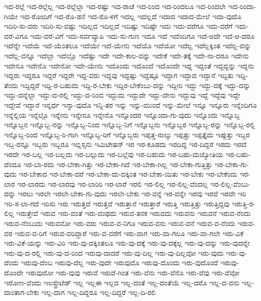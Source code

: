 {ಇದ-ರಲ್ಲೆ
ಇದ-ರಲ್ಲೆಲ್ಲ
ಇದ-ರಲ್ಲೆಲ್ಲಾ
ಇದ-ರಷ್ಟು
ಇದ-ರಾಚೆ
ಇದ-ರಿಂದ
ಇದ-ರಿಂದಲೂ
ಇದ-ರಿಂದಲೇ
ಇದ-ರಿಂದಾ-ಗಿಯೇ
ಇದ-ರೊಂದಿಗೆ
ಇದ-ರೊ-ಡನೆ
ಇದ-ರೊ-ಳಗೆ
ಇದಲ್ಲ
ಇದಲ್ಲದೆ
ಇದಾದ
ಇದಾದ-ಮೇಲೆ
ಇದಾ-ವುದೊ
ಇದಿರಿ-ಸು-ವರು
ಇದಿರಿ-ಸು-ವಷ್ಟು
ಇದಿಲ್ಲದ
ಇದಿಲ್ಲದೆ
ಇದಿಷ್ಟು
ಇದಿಷ್ಟೇ
ಇದು
ಇದು-ವರೆಗೂ
ಇದು-ವರೆಗೆ
ಇದು-ವರೆ-ವಿಗೂ
ಇದು-ವರೆ-ವಿಗೆ
ಇದು-ಸರ್ವವ್ಯಾಪಿ
ಇದು-ಸು-ಗುಣ
ಇದೂ
ಇದೆ
ಇದೆಂದಿಗೂ
ಇದೆ-ಅದೇ
ಇದೆ-ಆ-ದರೂ
ಇದೆನ್ನೇ
ಇದೆಯೆ
ಇದೆ-ಯೆಂತಲೂ
ಇದೆಯೇ
ಇದೆ-ಯೇನು
ಇದೆಯೊ
ಇದೆಯೋ
ಇದೆಲ್ಲ
ಇದೆಲ್ಲಕ್ಕಿಂತ
ಇದೆಲ್ಲ-ವನ್ನು
ಇದೆಲ್ಲ-ವನ್ನೂ
ಇದೆಲ್ಲಾ
ಇದೆಲ್ಲೊ
ಇದೆಷ್ಟು
ಇದೇ
ಇದೇ-ಕಾಲ-ವನ್ನು
ಇದೇಕೆ
ಇದೇ-ತಕ್ಕೆ
ಇದೇ-ನಾ-ದರೂ
ಇದೇನು
ಇದೇನೂ
ಇದೇನೊ
ಇದೇನೋ
ಇದೇ-ಯೇನು
ಇದೊಂದು
ಇದೊಂದೆ
ಇದೊಂದೇ
ಇದ್ದ
ಇದ್ದಂತೆ
ಇದ್ದದ್ದನ್ನು
ಇದ್ದನು
ಇದ್ದರು
ಇದ್ದರೂ
ಇದ್ದರೆ
ಇದ್ದರೇ
ಇದ್ದ-ವರು
ಇದ್ದವು
ಇದ್ದಷ್ಟು
ಇದ್ದಷ್ಟೂ
ಇದ್ದಾಗ
ಇದ್ದಾದ
ಇದ್ದಾನೆ
ಇದ್ದಿತು
ಇದ್ದಿ-ತೆಂದು
ಇದ್ದಿದ್ದರೆ
ಇದ್ದಿ-ರ-ಬಹುದು
ಇದ್ದಿ-ರ-ಬೇಕು
ಇದ್ದಿರ-ಬೇಕೆಂಬು-ದನ್ನು
ಇದ್ದೀರಿ
ಇದ್ದು
ಇದ್ದು-ದಕ್ಕೆ
ಇದ್ದು-ದನ್ನು
ಇದ್ದು-ದನ್ನೆಲ್ಲಾ
ಇದ್ದು-ದ-ರಲ್ಲಿ
ಇದ್ದು-ದ-ರಿಂದ
ಇದ್ದುದು
ಇದ್ದುದೇ
ಇದ್ದು-ದೇನು
ಇದ್ದುವು
ಇದ್ದೆ
ಇದ್ದೆವು
ಇದ್ದೇ
ಇದ್ದೇವೆ
ಇದ್ಧಾನೆ
ಇನ್ನರ್ಧ
ಇನ್ನಾ-ವುದೊ
ಇನ್ನಿ-ತರ
ಇನ್ನು
ಇನ್ನು-ಮುಂದೆ
ಇನ್ನು-ಮೇಲೆ
ಇನ್ನೂ
ಇನ್ನೂರು
ಇನ್ನೆಂದಿಗೂ
ಇನ್ನೆಲ್ಲಿಯ
ಇನ್ನೆಲ್ಲೊ
ಇನ್ನೇನು
ಇನ್ನೇನೂ
ಇನ್ನೇನೊ
ಇನ್ನೊಂದರ
ಇನ್ನೊಂದಾ-ಗು-ವುದು
ಇನ್ನೊಂದು
ಇನ್ನೊಬ್ಬ
ಇನ್ನೊಬ್ಬನ
ಇನ್ನೊಬ್ಬ-ನನ್ನು
ಇನ್ನೊಬ್ಬ-ನಿಂದ
ಇನ್ನೊಬ್ಬ-ನಿಗೆ
ಇನ್ನೊಬ್ಬನು
ಇನ್ನೊಬ್ಬರ
ಇನ್ನೊಬ್ಬ-ರನ್ನು
ಇನ್ನೊಬ್ಬ-ರಲ್ಲಿ
ಇನ್ನೊಬ್ಬ-ರಿಂದ
ಇನ್ನೊಬ್ಬ-ರಿ-ಗಾಗಿ
ಇನ್ನೊಬ್ಬ-ರಿಗೆ
ಇನ್ನೊಬ್ಬರು
ಇಪ್ಪತ್ತ-ನಾಲ್ಕು
ಇಪ್ಪತ್ತು
ಇಪ್ಪತ್ತೈದು
ಇಪ್ಪುತ್ತು
ಇಬ್ಬರ
ಇಬ್ಬ-ರನ್ನೂ
ಇಬ್ಬರು
ಇಬ್ಬರೂ
ಇಬ್ಲಿಸ್ಸನು
ಇಮಿಟೇಷನ್
ಇರ
ಇರ-ಕೂಡದು
ಇರದಿದ್ದ
ಇರ-ದಿದ್ದರೆ
ಇರದು
ಇರದೆ
ಇರದೇ
ಇರ-ಬಲ್ಲ
ಇರ-ಬಲ್ಲದು
ಇರ-ಬಲ್ಲುದು
ಇರ-ಬಲ್ಲೆವು
ಇರ-ಬಹುದು
ಇರ-ಬಹು-ದುಜ್ಯೋತಿಯ
ಇರ-ಬಹು-ದೆಂದೂ
ಇರ-ಬಾ-ರದು
ಇರ-ಬೇಕಾ-ಗಿತ್ತು
ಇರ-ಬೇಕಾ-ಗಿದೆ
ಇರ-ಬೇಕಾ-ಗಿಲ್ಲ
ಇರ-ಬೇಕಾ-ಗುತ್ತಿತ್ತು
ಇರ-ಬೇಕಾ-ಗು-ವುದು
ಇರ-ಬೇಕಾದ
ಇರ-ಬೇಕಾ-ದರೆ
ಇರ-ಬೇಕಾ-ದು-ದಕ್ಕಿಂತ
ಇರ-ಬೇಕಾ-ಯಿತು
ಇರ-ಬೇಕು
ಇರ-ಬೇಕೆಂದು
ಇರ-ಲಾರ
ಇರ-ಲಾರದು
ಇರ-ಲಾರವು
ಇರ-ಲಾರಿರಿ
ಇರ-ಲಾರೆ
ಇರಲಿ
ಇರ-ಲಿಲ್ಲ
ಇರ-ಲಿಲ್ಲ-ವೆಂದಲ್ಲ
ಇರ-ಲಿಲ್ಲ-ವೆಂಬು-ದನ್ನು
ಇರಲು
ಇರಲೇ
ಇರಲೇ-ಬೇಕಾ-ಗು-ವುದು
ಇರಲೇ-ಬೇಕು
ಇರ-ವನ್ನೆ
ಇರ-ವನ್ನೇ
ಇರವು
ಇರವೆ
ಇರವೇ
ಇರಿ
ಇರಿ-ಸ-ಲಾ-ಗದೆ
ಇರಿಸು
ಇರು
ಇರುತ್ತದೆ
ಇರುತ್ತವೆ
ಇರುತ್ತಾನೆ
ಇರುತ್ತಾರೆ
ಇರುತ್ತಿ
ಇರುತ್ತಿತ್ತು
ಇರುತ್ತಿದ್ದವು
ಇರುತ್ತಿ-ರ-ಲಿಲ್ಲ
ಇರುತ್ತೇವೆ
ಇರುವ
ಇರು-ವಂತೆ
ಇರು-ವಂಥದು
ಇರುವ-ತನಕ
ಇರುವದು
ಇರುವನು
ಇರುವನೆ
ಇರುವ-ನೆಂದು
ಇರುವ-ನೆಂಬುದು
ಇರುವನೋ
ಇರು-ವರು
ಇರುವ-ವ-ನಿಗೂ
ಇರುವ-ವನು
ಇರುವ-ವನೆ
ಇರುವ-ವ-ನೆಂದು
ಇರುವ-ವರ
ಇರುವ-ವ-ರಿಗೆ
ಇರುವ-ವರಿದ್ದಾರೆ
ಇರು-ವ-ವರೆಗೆ
ಇರು-ವಾಗ
ಇರು-ವಾ-ಗಲೂ
ಇರು-ವಾ-ಗಲೇ
ಇರು-ವಿಕೆ
ಇರು-ವಿಕೆ-ಯನ್ನು
ಇರು-ವಿರಿ
ಇರು-ವು-ದಕ್ಕಿಂತಲೂ
ಇರು-ವು-ದಕ್ಕೆ
ಇರು-ವು-ದಕ್ಕೆಲ್ಲ
ಇರು-ವು-ದನ್ನು
ಇರು-ವುದನ್ನೇ
ಇರು-ವು-ದ-ರಲ್ಲಿ
ಇರು-ವು-ದ-ರಿಂದ
ಇರುವು-ದಾದರೆ
ಇರು-ವು-ದಿಲ್ಲ
ಇರು-ವು-ದಿಲ್ಲವೋ
ಇರು-ವುದು
ಇರು-ವು-ದೆಂದು
ಇರುವು-ದೆಂಬ
ಇರುವು-ದೆಲ್ಲ
ಇರು-ವುದೇ
ಇರುವುದೊ
ಇರುವು-ದೊಂದು
ಇರು-ವುದೊಂದೆ
ಇರುವು-ದೊಂದೇ
ಇರುವುದೋ
ಇರು-ವುವು
ಇರುವೆ
ಇರುವೆ-ಗಿಂತ
ಇರು-ವೆನು
ಇರು-ವೆನೊ
ಇರು-ವೆವು
ಇರು-ವೆವೋ
ಇರೋಣ-ವೆಂದು
ಇಲಸ್ಟ್ರೇಟೆಡ್
ಇಲ್ಲ
ಇಲ್ಲಈ
ಇಲ್ಲದ
ಇಲ್ಲ-ದಂತೆ
ಇಲ್ಲ-ದಂತೆಯೆ
ಇಲ್ಲ-ದರೊ
ಇಲ್ಲ-ದ-ವನು
ಇಲ್ಲ-ದಾಂತಾಗ-ಬೇಕು
ಇಲ್ಲ-ದಾಗ
ಇಲ್ಲ-ದಿದ್ದರೂ
ಇಲ್ಲ-ದಿದ್ದರೆ
ಇಲ್ಲ-ದಿ-ರಲಿ
}
